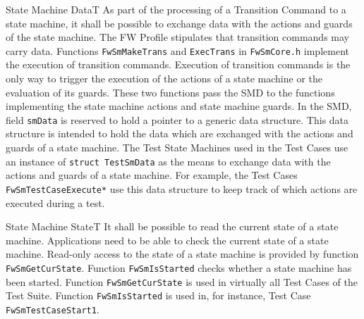 \documentclass[a4paper,10pt]{article}
\newenvironment{fw_req}[6]
{\addtocounter{subsubsection}{1}
	\hspace{0.2cm}\textbf{FW-\arabic{section}.\arabic{subsection}.\arabic{subsubsection}/#2
	\hspace{0.8cm} #1}
	\vspace{-10pt}
\begin{longtable}{p{2.7cm}P{8.5cm}}
\hline
\textsc{Requirement} & #3 \\
\textsc{Justification} & #4 \\
\textsc{Implementation} & #5  \\ 
\textsc{Verification} & #6  \\
\hline
}
{\end{longtable}}
\begin{document}
\begin{fw_req}{State Machine Data}{T}
{As part of the processing of a Transition Command to a state 
machine, it shall be possible to exchange data with the actions and guards of the 
state machine.}
{The FW Profile stipulates that transition commands may carry data.}
{Functions \texttt{FwSmMakeTrans} and \texttt{ExecTrans} 
in \texttt{FwSmCore.h} implement the execution of transition commands.
Execution of transition commands is the only way to trigger the execution of the actions 
of a state machine or the evaluation of its guards. 
These two functions pass the SMD to the functions implementing the state machine actions 
and state machine guards. 
In the SMD, field \texttt{smData} is reserved to hold a pointer to a generic data structure. 
This data structure is intended to hold the data which are exchanged with the actions 
and guards of a state machine.} 
{The Test State Machines used in the Test Cases use an instance 
of \texttt{struct TestSmData} as the means to exchange data with the actions and guards 
of a state machine. 
For example, the Test Cases \texttt{FwSmTestCaseExecute*} use this data structure to keep 
track of which actions are executed during a test.}
\end{fw_req}


\begin{fw_req}{State Machine State}{T}
{It shall be possible to read the current state of a state machine.}
{Applications need to be able to check the current state of 
a state machine.}
{Read-only access to the state of a state machine is provided 
by function \texttt{FwSmGetCurState}. 
Function \texttt{FwSmIsStarted} checks whether a state machine has been started.} 
{Function \texttt{FwSmGetCurState} is used in virtually all 
Test Cases of the Test Suite. 
Function \texttt{FwSmIsStarted} is used in, for instance, Test Case 
\texttt{FwSmTestCaseStart1}.}
\end{fw_req}
\end{document}
